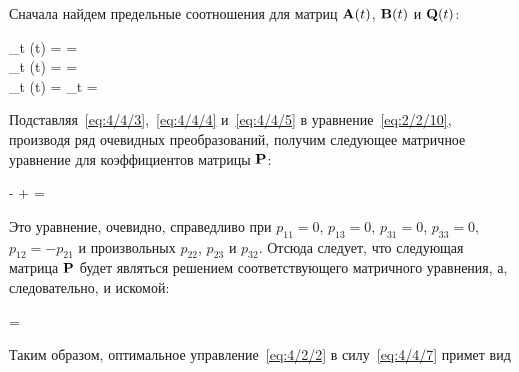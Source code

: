 Сначала найдем предельные соотношения для матриц $\mathbf{A}(t)$, $\mathbf{B}(t)$ и $\mathbf{Q}(t)$:

\beqarr
		\lim\limits_{t \to \infty}(t) =  =  \text{;} \\
		\lim\limits_{t \to \infty}(t) =  =  \text{;} \\
		\lim\limits_{t \to \infty}(t) = \lim\limits_{t \to \infty}  =  
\eeqarr

Подставляя~\ref{eq:4/4/3},~\ref{eq:4/4/4} и~\ref{eq:4/4/5} в уравнение~\ref{eq:2/2/10}, производя ряд очевидных преобразований, получим следующее матричное уравнение для коэффициентов матрицы $\mathbf{P}$:

	-  +  =  
\eeq

Это уравнение, очевидно, справедливо при $p_{11}=0$, $p_{13}=0$, $p_{31}=0$, $p_{33}=0$, $p_{12} = -p_{21}$ и произвольных $p_{22}$, $p_{23}$ и $p_{32}$. Отсюда следует, что следующая матрица $\mathbf{P}$ будет являться решением соответствующего матричного уравнения, а, следовательно, и искомой:

	 =  
\eeq

Таким образом, оптимальное управление~\vref{eq:4/2/2} в силу~\ref{eq:4/4/7} примет вид

